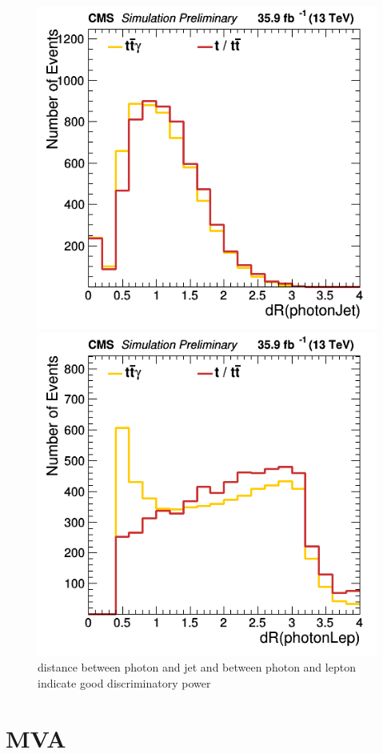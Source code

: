 \documentclass[11pt]{scrartcl}
\begin{document}
	\begin{figure}[H]
	\centering
	\begin{minipage}{.5\textwidth}
	  \centering
	  \includegraphics[width=0.70\linewidth]{figures/Select3/photonJetdR.png}
	\end{minipage}%
	\begin{minipage}{.5\textwidth}
	  \centering
	  \includegraphics[width=0.70\linewidth]{figures/Select3/photonLepdR.png}
	\end{minipage}
	\caption{distance between photon and jet and between photon and lepton indicate good discriminatory power}
	\label{fig:photonLepdR}
	\end{figure}

\section{MVA}
\end{document}
